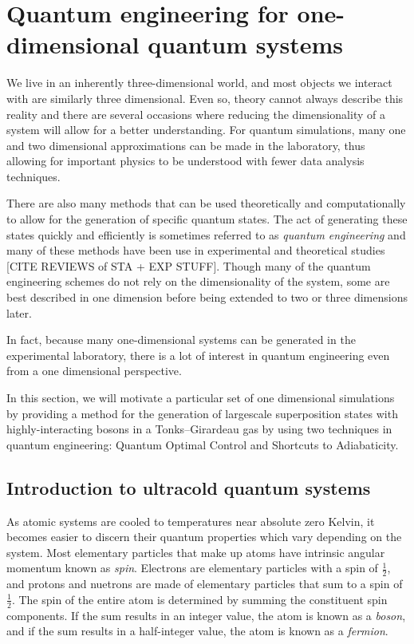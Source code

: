 \chapter{Quantum engineering for one-dimensional quantum systems}
\label{ch:1d}

We live in an inherently three-dimensional world, and most objects we interact with are similarly three dimensional.
Even so, theory cannot always describe this reality and there are several occasions where reducing the dimensionality of a system will allow for a better understanding.
For quantum simulations, many one and two dimensional approximations can be made in the laboratory, thus allowing for important physics to be understood with fewer data analysis techniques.

There are also many methods that can be used theoretically and computationally to allow for the generation of specific quantum states.
The act of generating these states quickly and efficiently is sometimes referred to as \textit{quantum engineering} and many of these methods have been use in experimental and theoretical studies [CITE REVIEWS of STA + EXP STUFF].
Though many of the quantum engineering schemes do not rely on the dimensionality of the system, some are best described in one dimension before being extended to two or three dimensions later.

In fact, because many one-dimensional systems can be generated in the experimental laboratory, there is a lot of interest in quantum engineering even from a one dimensional perspective.

In this section, we will motivate a particular set of one dimensional simulations by providing a method for the generation of largescale superposition states with highly-interacting bosons in a Tonks--Girardeau gas by using two techniques in quantum engineering: Quantum Optimal Control and Shortcuts to Adiabaticity.

\section{Introduction to ultracold quantum systems}

As atomic systems are cooled to temperatures near absolute zero Kelvin, it becomes easier to discern their quantum properties which vary depending on the system.
Most elementary particles that make up atoms have intrinsic angular momentum known as \textit{spin}.
Electrons are elementary particles with a spin of $\frac{1}{2}$, and protons and nuetrons are made of elementary particles that sum to a spin of $\frac{1}{2}$.
The spin of the entire atom is determined by summing the constituent spin components.
If the sum results in an integer value, the atom is known as a \textit{boson}, and if the sum results in a half-integer value, the atom is known as a \textit{fermion}.

